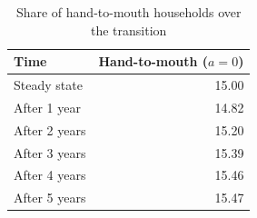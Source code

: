 \begin{table}
\caption{Share of hand-to-mouth households over the transition}
\label{tab:htm_shares_transition}
\begin{tabular}{lr}
\toprule
Time & Hand-to-mouth ($a=0$) \\
\midrule
Steady state & 15.00 \\
After 1 year & 14.82 \\
After 2 years & 15.20 \\
After 3 years & 15.39 \\
After 4 years & 15.46 \\
After 5 years & 15.47 \\
\bottomrule
\end{tabular}
\end{table}
